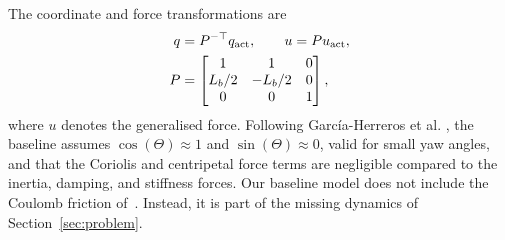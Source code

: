 The coordinate and force transformations are
\begin{equation}
\begin{aligned}
  q &= P^{-\top}q_{\mathrm{act}},
  \qquad
  u = Pu_{\mathrm{act}},\\
  P &=
  \begin{bmatrix}
    1 & 1 & 0\\
    L_b/2 & -L_b/2 & 0\\
    0 & 0 & 1
  \end{bmatrix},
\end{aligned}
\label{eq:Ptransform}
\end{equation}
where $u$ denotes the generalised force.
Following Garc\'ia-Herreros et al. \cite{garcia2013model}, the baseline assumes $\cos(\Theta)\approx1$ and $\sin(\Theta)\approx0$, 
valid for small yaw angles, and that the Coriolis and centripetal force terms are
negligible compared to the inertia, damping, and stiffness forces.
Our baseline model does not include the Coulomb friction
of~\cite[Eq.~(6)]{garcia2013model}.
Instead, it is part of the missing dynamics of Section~\ref{sec:problem}.
